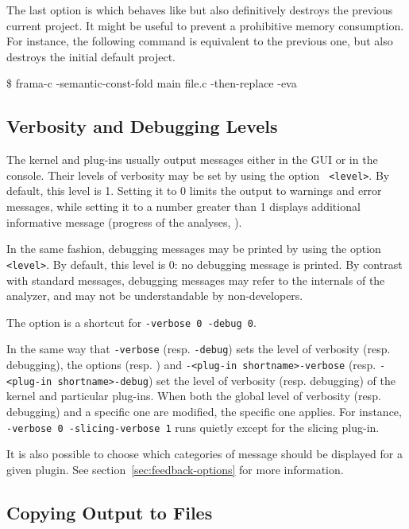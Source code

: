 The last option is  which behaves like
 but also definitively destroys the previous current
project. It might be useful to prevent a prohibitive memory consumption. For
instance, the following command is equivalent to the previous one, but also
destroys the initial default project.
\begin{shell}
\$ frama-c -semantic-const-fold main file.c -then-replace -eva
\end{shell}

\subsection{Verbosity and Debugging Levels}

The \FramaC kernel and plug-ins usually output messages either in the GUI or
in the console. Their levels of verbosity may be set by using the option
\texttt{ <level>}. By default, this level is
1. Setting it to 0 limits the output to warnings and error messages, while setting it
to a number greater than 1 displays additional informative message (progress
of the analyses, \etc).

In the same fashion, debugging messages may be printed by using the option
\texttt{ <level>}. By default, this level is 0: no
debugging message is printed. By contrast with standard messages, debugging
messages may refer to the internals of the analyzer, and may not be
understandable by non-developers.

The option  is a shortcut for \texttt{-verbose 0
  -debug 0}.

In the same way that \texttt{-verbose} (resp. \texttt{-debug}) sets the level
of verbosity (resp. debugging), the options
(resp. ) and
\texttt{-<plug-in shortname>-verbose} (resp. \texttt{-<plug-in shortname>-debug}) set the
level of verbosity (resp. debugging) of the kernel and particular
plug-ins. When both the global level of verbosity (resp. debugging) and a
specific one are modified, the specific one applies. For instance,
\texttt{-verbose 0 -slicing-verbose 1} runs \FramaC quietly except for the
slicing plug-in.

It is also possible to choose which categories of message should be displayed
for a given plugin. See section~\ref{sec:feedback-options} for more information.

\subsection{Copying Output to Files}

